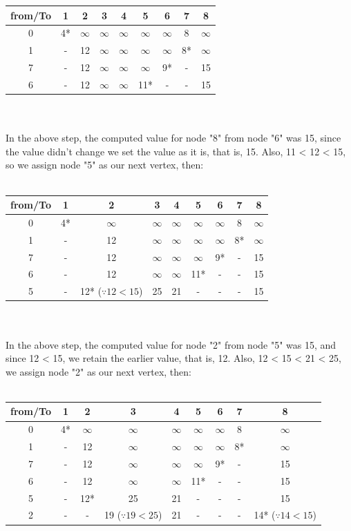 \begin{tabular}{c | c| c| c| c| c| c| c| c}
	from/To & 1 & 2 & 3 & 4 & 5 & 6 & 7 & 8 \\
	\hline
	0 & 4* & $\infty$ & $\infty$& $\infty$& $\infty$& $\infty$ & 8 & $\infty$\\
	1 & - & 12 & $\infty$& $\infty$& $\infty$& $\infty$ & 8* & $\infty$\\
	7 & - & 12 & $\infty$& $\infty$& $\infty$& 9* & - & 15\\
	6 & - & 12 & $\infty$& $\infty$& 11* & - & - & 15 \\
\end{tabular}\\\\
In the above step, the computed value for node "8" from node "6" was 15, since the value didn't change we set the value as it is, that is, 15. Also, 11 < 12 < 15, so we assign node "5" as our next vertex, then:\\\\
\begin{tabular}{c | c| c| c| c| c| c| c| c}
	from/To & 1 & 2 & 3 & 4 & 5 & 6 & 7 & 8 \\
	\hline
	0 & 4* & $\infty$ & $\infty$& $\infty$& $\infty$& $\infty$ & 8 & $\infty$\\
	1 & - & 12 & $\infty$& $\infty$& $\infty$& $\infty$ & 8* & $\infty$\\
	7 & - & 12 & $\infty$& $\infty$& $\infty$& 9* & - & 15\\
	6 & - & 12 & $\infty$& $\infty$& 11* & - & - & 15 \\
	5 & - & 12* ($\because 12 < 15$) & 25 & 21 & - & - & - & 15 \\
\end{tabular}\\\\
In the above step, the computed value for node "2" from node "5" was 15, and since 12 < 15, we retain the earlier value, that is, 12. Also, 12 < 15 < 21 < 25, we assign node "2" as our next vertex, then:\\\\
\begin{tabular}{c | c| c| c| c| c| c| c| c}
	from/To & 1 & 2 & 3 & 4 & 5 & 6 & 7 & 8 \\
	\hline
	0 & 4* & $\infty$ & $\infty$& $\infty$& $\infty$& $\infty$ & 8 & $\infty$\\
	1 & - & 12 & $\infty$& $\infty$& $\infty$& $\infty$ & 8* & $\infty$\\
	7 & - & 12 & $\infty$& $\infty$& $\infty$& 9* & - & 15\\
	6 & - & 12 & $\infty$& $\infty$& 11* & - & - & 15 \\
	5 & - & 12* & 25 & 21 & - & - & - & 15 \\
	2 & - & - & 19 ($\because 19 < 25$)& 21 & - & - & - & 14* ($\because 14 < 15$)\\
\end{tabular}\\\\

